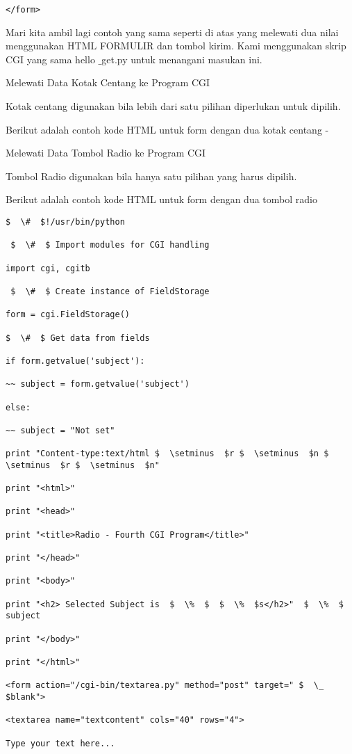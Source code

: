 \begin{enumerate}
\begin{enumerate}
\begin{verbatim}
</form>

\end{verbatim}
Mari kita ambil lagi contoh yang sama seperti di atas yang melewati dua nilai menggunakan HTML FORMULIR dan tombol kirim. Kami menggunakan skrip CGI yang sama hello $  \_  $get.py untuk menangani masukan ini.

Melewati Data Kotak Centang ke Program CGI

Kotak centang digunakan bila lebih dari satu pilihan diperlukan untuk dipilih.

Berikut adalah contoh kode HTML untuk form dengan dua kotak centang -

Melewati Data Tombol Radio ke Program CGI

Tombol Radio digunakan bila hanya satu pilihan yang harus dipilih.

Berikut adalah contoh kode HTML untuk form dengan dua tombol radio
\begin{verbatim}
$  \#  $!/usr/bin/python

 $  \#  $ Import modules for CGI handling

import cgi, cgitb

 $  \#  $ Create instance of FieldStorage

form = cgi.FieldStorage()

$  \#  $ Get data from fields

if form.getvalue('subject'):

~~ subject = form.getvalue('subject')

else:

~~ subject = "Not set"

print "Content-type:text/html $  \setminus  $r $  \setminus  $n $  \setminus  $r $  \setminus  $n"

print "<html>"

print "<head>"

print "<title>Radio - Fourth CGI Program</title>"

print "</head>"

print "<body>"

print "<h2> Selected Subject is  $  \%  $  $  \%  $s</h2>"  $  \%  $ subject

print "</body>"

print "</html>"

<form action="/cgi-bin/textarea.py" method="post" target=" $  \_  $blank">

<textarea name="textcontent" cols="40" rows="4">

Type your text here...


\end{verbatim}
\end{enumerate}
\end{enumerate}
